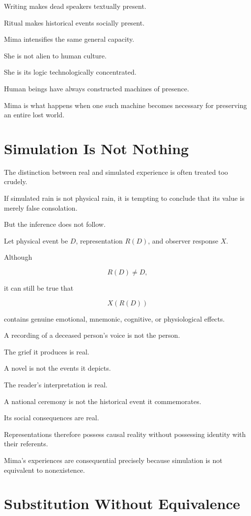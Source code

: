 \documentclass[11pt,oneside]{book}
\theoremstyle{definition}
\theoremstyle{remark}
\begin{document}
Writing makes dead speakers textually present.

Ritual makes historical events socially present.

Mima intensifies the same general capacity.

She is not alien to human culture.

She is its logic technologically concentrated.

Human beings have always constructed machines of presence.

Mima is what happens when one such machine becomes necessary for preserving an entire lost world.

\section{Simulation Is Not Nothing}

The distinction between real and simulated experience is often treated too crudely.

If simulated rain is not physical rain, it is tempting to conclude that its value is merely false consolation.

But the inference does not follow.

Let physical event be \(D\), representation \(R(D)\), and observer response \(X\).

Although

\[
R(D)\neq D,
\]

it can still be true that

\[
X(R(D))
\]

contains genuine emotional, mnemonic, cognitive, or physiological effects.

A recording of a deceased person's voice is not the person.

The grief it produces is real.

A novel is not the events it depicts.

The reader's interpretation is real.

A national ceremony is not the historical event it commemorates.

Its social consequences are real.

Representations therefore possess causal reality without possessing identity with their referents.

Mima's experiences are consequential precisely because simulation is not equivalent to nonexistence.

\section{Substitution Without Equivalence}
\end{document}
